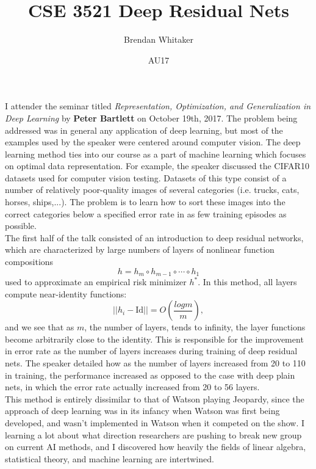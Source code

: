 \documentclass[10pt,oneside,reqno]{amsart}
\theoremstyle{plain}
\theoremstyle{definition}
\begin{document}
\title{CSE 3521 Deep Residual Nets}

\date{AU17}

\author[Brendan Whitaker]{Brendan Whitaker}

\maketitle

I attender the seminar titled \textit{Representation, Optimization, and Generalization in Deep Learning} by \textbf{Peter Bartlett} on October 19th, 2017. The problem being addressed was in general any application of deep learning, but most of the examples used by the speaker were centered around computer vision. The deep learning method ties into our course as a part of machine learning which focuses on optimal data representation. For example, the speaker discussed the CIFAR10 datasets used for computer vision testing. Datasets of this type consist of a number of relatively poor-quality images of several categories (i.e. trucks, cats, horses, ships,...). The problem is to learn how to sort these images into the correct categories below a specified error rate in as few training episodes as possible. \\

The first half of the talk consisted of an introduction to deep residual networks, which are characterized by large numbers of layers of nonlinear function compositions 
\[h = h_m \circ h_{m - 1} \circ \cdots \circ h_1\] used to approximate an empirical risk minimizer $h^*$. In this method, all layers compute near-identity functions: 
\[||h_i - \text{Id}|| = O\left(\frac{logm}{m}\right),\]
and we see that as $m$, the number of layers, tends to infinity, the layer functions become arbitrarily close to the identity. This is responsible for the improvement in error rate as the number of layers increases during training of deep residual nets. The speaker detailed how as the number of layers increased from 20 to 110 in training, the performance increased as opposed to the case with deep plain nets, in which the error rate actually increased from 20 to 56 layers. \\

This method is entirely dissimilar to that of Watson playing Jeopardy, since the approach of deep learning was in its infancy when Watson was first being developed, and wasn't implemented in Watson when it competed on the show. I learning a lot about what direction researchers are pushing to break new group on current AI methods, and I discovered how heavily the fields of linear algebra, statistical theory, and machine learning are intertwined. 
\end{document}
